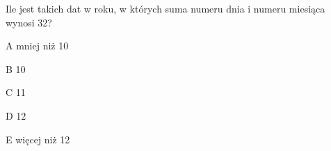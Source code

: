 \begin{tresc}
Ile jest takich dat w roku, w których suma numeru dnia i numeru miesiąca wynosi 32?
\end{tresc}
\begin{wariant}{A} mniej niż 10 \end{wariant}
\begin{wariant}{B} 10 \end{wariant}
\begin{wariant}{C} 11 \end{wariant}
\begin{wariant}{D} 12 \end{wariant}
\begin{wariant}{E} więcej niż 12 \end{wariant}
